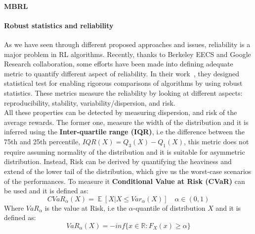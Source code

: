 \documentclass{article}
\DeclareMathOperator{\EX}{\mathbb{E}}%
\begin{document}
\paragraph{MBRL}
\paragraph{Robust statistics and reliability}
As we have seen through different proposed approaches and issues, reliability is a major problem in RL algorithms. Recently, thanks to  Berkeley EECS and Google Research collaboration, some efforts have been made into defining adequate metric to quantify different aspect of reliability. In their work~\cite{GoogleMeasure}, they designed statistical test for enabling rigorous comparisons of algorithms by using robust statistics. These metrics measure the reliability by looking at different aspects: reproducibility, stability, variability/dispersion, and risk.\\
All these properties can be detected by measuring dispersion, and risk of the average rewards. The former one, measure the width of the distribution and it is inferred using the \textbf{Inter-quartile range (IQR)}, i.e the difference between the 75th and 25th percentile, $ IQR(X) = Q_3(X) - Q_1(X)$, this metric does not require assuming normality of the distribution and it is suitable for asymmetric distribution.
Instead, Risk can be derived by quantifying the heaviness and extend of the lower tail of the distribution, which give us the worst-case scenarios of the performances. To measure it \textbf{Conditional Value at Risk (CVaR)} can be used and it is defined as:
\begin{equation}
CVaR_\alpha(X) = \EX \left[ X \vert X \leq Var_\alpha(X) \right]  \quad \alpha \in (0,1)
\end{equation}
Where $VaR_\alpha$ is the value at Risk, i.e the $\alpha$-quantile of distribution $X$ and it is defined as:
\begin{equation}
VaR_\alpha(X) = -inf \{ x \in \mathbb{R}: F_X(x) \ge \alpha \}
\end{equation}
\end{document}
